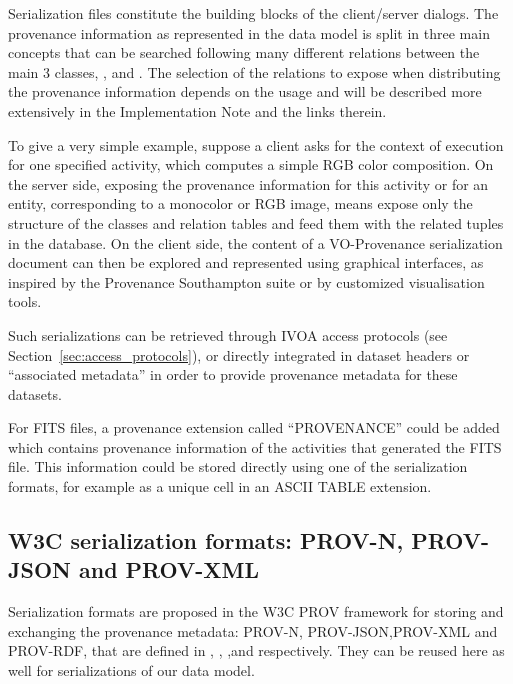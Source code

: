 
Serialization files constitute the building blocks of the client/server dialogs.
The provenance information as represented in the data model is split in three main concepts that can be searched following many different relations between the main 3 classes, ,  and .
The selection of the relations to expose when distributing the provenance information depends on the usage and will be described more extensively in the Implementation Note \citep{std:ProvenanceImplementationNote} and the links therein.

To give a very simple example, suppose a client asks for the context of execution for one specified activity, which computes a simple RGB color composition. 
On the server side, exposing the provenance information for this activity or for an entity, corresponding to a monocolor or RGB image, 
means expose only the structure of the classes
and relation tables and feed them with the related tuples in the database.
On the client side, the content of a VO-Provenance serialization document can then be explored and represented using graphical interfaces, as inspired by the Provenance Southampton suite or by customized visualisation tools.

Such serializations can be retrieved through IVOA access protocols (see Section~\ref{sec:access_protocols}), %
or directly integrated in dataset headers or ``associated metadata'' in order to provide provenance metadata for these datasets. 

For FITS files, a provenance extension called ``PROVENANCE'' could be added which contains provenance information of the activities that generated the FITS file. This information could be stored directly using one of the serialization formats, for example as a unique cell in an ASCII TABLE extension.




\subsection{W3C serialization formats: PROV-N, PROV-JSON and PROV-XML}

Serialization formats are proposed in the W3C PROV framework for storing and exchanging the provenance metadata: {PROV-N}, {PROV-JSON},{PROV-XML} and PROV-RDF, that are defined in \cite{std:PROV-N}, \cite{std:PROV-JSON}, \cite{std:PROV-XML},and \cite{std:PROV-O} respectively. 
They can be reused here as well for serializations of our data model. 

